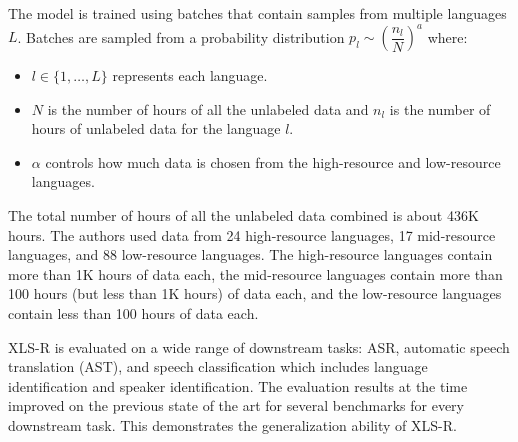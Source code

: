 The model is trained using batches that contain samples from multiple languages $L$. 
Batches are sampled from a probability distribution $p_l \sim \left(\dfrac{n_l}{N}\right)^{a}$ where:
\begin{itemize}
    \item $l \in \{1, \dots, L\}$ represents each language.
    \item $N$ is the number of hours of all the unlabeled data and $n_l$ is the number of hours of unlabeled data for the language $l$.
    \item $\alpha$ controls how much data is chosen from the high-resource and low-resource languages.
\end{itemize}

The total number of hours of all the unlabeled data combined is about 436K hours. The authors used data from 24 high-resource languages, 17 mid-resource languages, and 88 low-resource languages.
The high-resource languages contain more than 1K hours of data each, the mid-resource languages contain more than 100 hours (but less than 1K hours)
of data each, and the low-resource languages contain less than 100 hours of data each.

XLS-R is evaluated on a wide range of downstream tasks: ASR, automatic speech translation (AST), and speech classification which includes language identification and speaker identification.
The evaluation results at the time improved on the previous state of the art for several benchmarks for every downstream task. 
This demonstrates the generalization ability of XLS-R.